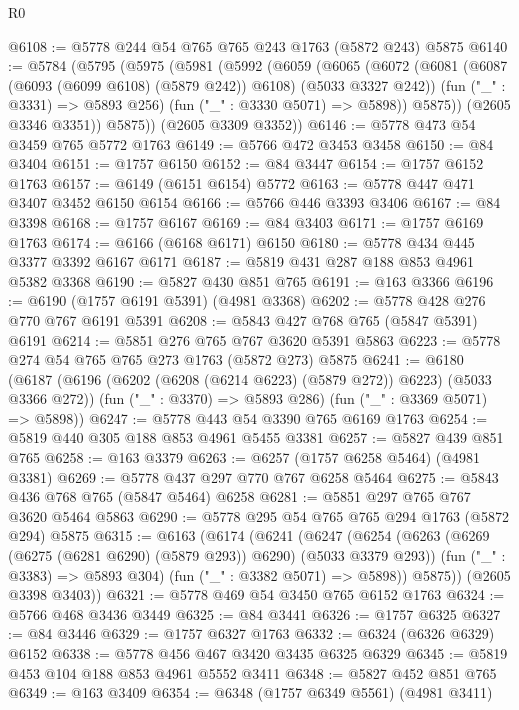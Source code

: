 \begin{lexlean}{R0}
\begin{coremodule}
{{{{{@6108 := @5778 @244 @54 @765 @765 @243 @1763 (@5872 @243) @5875
@6140 := @5784
    (@5795
      (@5975
        (@5981
          (@5992
            (@6059
              (@6065
                (@6072
                  (@6081 (@6087 (@6093 (@6099 @6108) (@5879 @242)) @6108) (@5033 @3327 @242))
                  (fun ("_" : @3331) => @5893 @256)
                  (fun ("_" : @3330 @5071) => @5898))
                @5875))
            (@2605 @3346 @3351))
          @5875))
      (@2605 @3309 @3352))
@6146 := @5778 @473 @54 @3459 @765 @5772 @1763
@6149 := @5766 @472 @3453 @3458
@6150 := @84 @3404
@6151 := @1757 @6150
@6152 := @84 @3447
@6154 := @1757 @6152 @1763
@6157 := @6149 (@6151 @6154) @5772
@6163 := @5778 @447 @471 @3407 @3452 @6150 @6154
@6166 := @5766 @446 @3393 @3406
@6167 := @84 @3398
@6168 := @1757 @6167
@6169 := @84 @3403
@6171 := @1757 @6169 @1763
@6174 := @6166 (@6168 @6171) @6150
@6180 := @5778 @434 @445 @3377 @3392 @6167 @6171
@6187 := @5819 @431 @287 @188 @853 @4961 @5382 @3368
@6190 := @5827 @430 @851 @765
@6191 := @163 @3366
@6196 := @6190 (@1757 @6191 @5391) (@4981 @3368)
@6202 := @5778 @428 @276 @770 @767 @6191 @5391
@6208 := @5843 @427 @768 @765 (@5847 @5391) @6191
@6214 := @5851 @276 @765 @767 @3620 @5391 @5863
@6223 := @5778 @274 @54 @765 @765 @273 @1763 (@5872 @273) @5875
@6241 := @6180
    (@6187
      (@6196 (@6202 (@6208 (@6214 @6223) (@5879 @272)) @6223) (@5033 @3366 @272))
      (fun ("_" : @3370) => @5893 @286)
      (fun ("_" : @3369 @5071) => @5898))
@6247 := @5778 @443 @54 @3390 @765 @6169 @1763
@6254 := @5819 @440 @305 @188 @853 @4961 @5455 @3381
@6257 := @5827 @439 @851 @765
@6258 := @163 @3379
@6263 := @6257 (@1757 @6258 @5464) (@4981 @3381)
@6269 := @5778 @437 @297 @770 @767 @6258 @5464
@6275 := @5843 @436 @768 @765 (@5847 @5464) @6258
@6281 := @5851 @297 @765 @767 @3620 @5464 @5863
@6290 := @5778 @295 @54 @765 @765 @294 @1763 (@5872 @294) @5875
@6315 := @6163
    (@6174
      (@6241
        (@6247
          (@6254
            (@6263 (@6269 (@6275 (@6281 @6290) (@5879 @293)) @6290) (@5033 @3379 @293))
            (fun ("_" : @3383) => @5893 @304)
            (fun ("_" : @3382 @5071) => @5898))
          @5875))
      (@2605 @3398 @3403))
@6321 := @5778 @469 @54 @3450 @765 @6152 @1763
@6324 := @5766 @468 @3436 @3449
@6325 := @84 @3441
@6326 := @1757 @6325
@6327 := @84 @3446
@6329 := @1757 @6327 @1763
@6332 := @6324 (@6326 @6329) @6152
@6338 := @5778 @456 @467 @3420 @3435 @6325 @6329
@6345 := @5819 @453 @104 @188 @853 @4961 @5552 @3411
@6348 := @5827 @452 @851 @765
@6349 := @163 @3409
@6354 := @6348 (@1757 @6349 @5561) (@4981 @3411)
}}}}}
\end{coremodule}
\end{lexlean}

